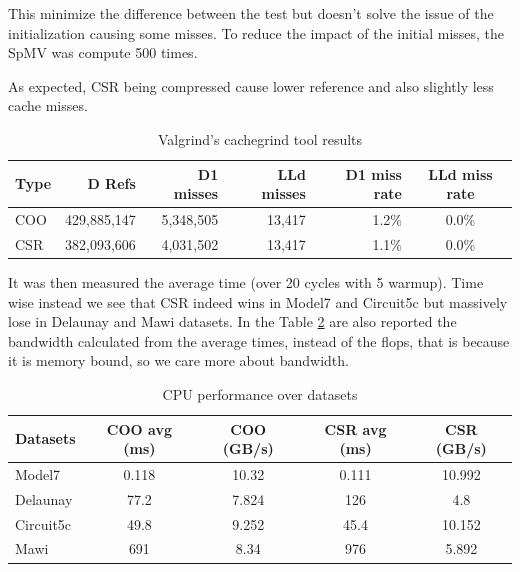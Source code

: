 \documentclass[conference]{IEEEtran}
\begin{document}
This minimize the difference between the test but doesn't solve the issue of the initialization causing some misses. To reduce the impact of the initial misses, the SpMV was compute 500 times.

As expected, CSR being compressed cause lower reference and also slightly less cache misses.
\begin{table}[hbt!]
	\centering
	\begin{adjustbox}{width=\columnwidth}
		\begin{tabular}{lrrrrc}
			\toprule
			\textbf{Type} & \textbf{D Refs} & \textbf{D1 misses} & \textbf{LLd misses} & \textbf{D1 miss rate} & \textbf{LLd miss rate} \\
			\midrule
			COO & 429,885,147 & 5,348,505 & 13,417 & 1.2\% & 0.0\% \\
			CSR & 382,093,606 & 4,031,502 & 13,417 & 1.1\% & 0.0\% \\
			\bottomrule
		\end{tabular}
	\end{adjustbox}
	\vspace{1em}

	\caption{Valgrind's cachegrind tool results}
	\label{tab:cache-results}
\end{table}

It was then measured the average time (over 20 cycles with 5 warmup). Time wise instead we see that CSR indeed wins in Model7 and Circuit5c but massively lose in Delaunay and Mawi datasets. In the Table \ref{tab:time-cpu-results} are also reported the bandwidth calculated from the average times, instead of the flops, that is because it is memory bound, so we care more about bandwidth.

\begin{table}[hbt!]
	\centering
	\begin{adjustbox}{width=\columnwidth}
		\begin{tabular}{lcccc}
			\toprule
			\textbf{Datasets} & \textbf{COO avg (ms)} &\textbf{COO (GB/s)} & \textbf{CSR avg (ms)} & \textbf{CSR (GB/s)}\\
			\midrule
			Model7 & 0.118 & 10.32 & 0.111 & 10.992\\
			Delaunay & 77.2 & 7.824 & 126 & 4.8\\
			Circuit5c & 49.8 & 9.252 & 45.4 & 10.152\\
			Mawi & 691 & 8.34 & 976 & 5.892\\
			\bottomrule
		\end{tabular}
	\end{adjustbox}
	\vspace{1em}

	\caption{CPU performance over datasets}
	\label{tab:time-cpu-results}
\end{table}
\end{document}
